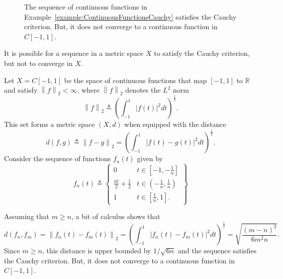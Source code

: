 \begin{figure}[ht]
\begin{center}
\vspace{-8mm}
\end{center}
\caption{The sequence of continuous functions in Example~\ref{example:ContinuousFunctionsCauchy} satisfies the Cauchy criterion.
But, it does not converge to a continuous function in $C[-1,1]$.}
\end{figure}

It is possible for a sequence in a metric space $X$ to satisfy the Cauchy criterion, but not to converge in $X$.

\begin{example}
\label{example:ContinuousFunctionsCauchy}
Let $X=C[-1,1]$ be the space of continuous functions that map $[-1,1]$ to $\mathbb{R}$ and satisfy $\left\| f \right\|_2 < \infty$, where $\left\| f \right\|_2$ denotes the $L^2$ norm
\begin{equation*}
\left\| f \right\|_2 \triangleq \left( \int_{-1}^1 |f(t)|^2 dt \right)^{\frac{1}{2}}.
\end{equation*}
This set forms a metric space $(X,d)$ when equipped with the distance
\[ d(f, g) \triangleq \left\| f - g \right\|_2
= \left( \int_{-1}^1 |f(t) - g(t)|^2 dt \right)^{\frac{1}{2}}. \]
Consider the sequence of functions $f_n(t)$ given by
\begin{equation*}
f_n(t) \triangleq \left\{ \begin{array}{ll}
0 & t \in \left[ -1, -\frac{1}{n} \right] \\
\frac{nt}{2} + \frac{1}{2} & t \in \left( -\frac{1}{n}, \frac{1}{n} \right) \\
1 & t \in \left[ \frac{1}{n}, 1 \right].
\end{array} \right\}
\end{equation*}

Assuming that $m \geq n$, a bit of calculus shows that
\begin{equation*}
d(f_n, f_m) = \left\| f_n(t) - f_m(t) \right\|_2
= \left( \int_{-1}^1 |f_n(t) - f_m(t)|^2 dt \right)^{\frac{1}{2}}
= \sqrt{\frac{(m-n)^2}{6m^2n}}.
\end{equation*}
Since $m\geq n$, this distance is upper bounded by $1/\sqrt{6n}$ and the sequence satisfies the Cauchy criterion.
But, it does not converge to a continuous function in $C[-1,1]$.
\end{example}


